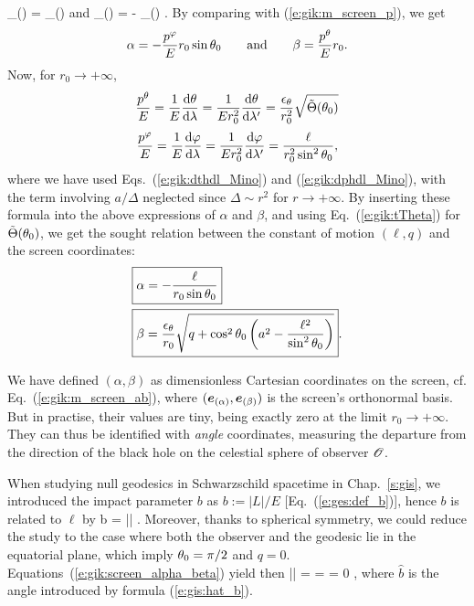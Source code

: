     _{(\alpha)} = _{(\ph)} \quad\mbox{and}\quad
    _{(\beta)} = - _{(\th)} .
\ee
By comparing with (\ref{e:gik:m_screen_p}), we get
\[
    \alpha = -  \frac{p^\varphi}{E} r_0 \sin\theta_0
    \qquad\mbox{and}\qquad
    \beta = \frac{p^\theta}{E} r_0 .
\]
Now, for $r_0\to +\infty$,
\[
   \frac{p^\theta}{E} = \frac{1}{E} \frac{\mathrm{d} \theta}{\mathrm{d} \lambda} = \frac{1}{E r_0^2}  \frac{\mathrm{d} \theta}{\mathrm{d} \lambda'} =
    \frac{\epsilon_\theta}{r_0^2} \sqrt{\tilde\Theta(\theta_0)}
\]
\[
 \frac{p^\varphi}{E} = \frac{1}{E} \frac{\mathrm{d} \varphi}{\mathrm{d} \lambda} = \frac{1}{E r_0^2}  \frac{\mathrm{d} \varphi}{\mathrm{d} \lambda'}
 = \frac{\ell}{r_0^2 \sin^2\theta_0} ,
\]
where we have used Eqs.~(\ref{e:gik:dthdl_Mino}) and (\ref{e:gik:dphdl_Mino}), with the
term involving $a/\Delta$ neglected since $\Delta \sim r^2$ for $r\to +\infty$.
By inserting these formula into the above expressions of $\alpha$ and $\beta$,
and using Eq.~(\ref{e:gik:tTheta}) for $\tilde\Theta(\theta_0)$,
we get the sought relation between the constant of motion $(\ell, q)$ and
the screen coordinates:
\begin{subequations}
\label{e:gik:screen_alpha_beta}
\begin{align}
& \fbox{$\displaystyle  \alpha = - \frac{\ell}{r_0\sin\theta_0} $} \\
& \fbox{$\displaystyle  \beta = \frac{\epsilon_\theta}{r_0} \sqrt{ q + \cos^2\theta_0 \left( a^2
    - \frac{\ell^2}{\sin^2\theta_0} \right) } $} .
\end{align}
\end{subequations}

\begin{remark}
We have defined $(\alpha,\beta)$ as dimensionless Cartesian coordinates on
the screen, cf. Eq.~(\ref{e:gik:m_screen_ab}), where $(\bm{e}_{(\alpha)}, \bm{e}_{(\beta)})$
is the screen's orthonormal basis. But in practise, their values are tiny,
being exactly zero at the limit $r_0\to +\infty$. They can thus be identified
with \emph{angle} coordinates, measuring the departure from the direction
of the black hole on the celestial sphere of observer $\mathscr{O}$.
\end{remark}

\begin{remark}
When studying null geodesics in Schwarzschild spacetime in Chap.~\ref{s:gis}, we
introduced the impact parameter $b$ as $b := |L|/E$ [Eq.~(\ref{e:ges:def_b})], hence
$b$ is related to $\ell$ by
\be
    b = |\ell| .
\ee
Moreover, thanks to spherical symmetry, we could reduce the study to the case
where both the observer
and the geodesic lie in the equatorial plane, which imply $\theta_0 = \pi/2$
and $q=0$. Equations~(\ref{e:gik:screen_alpha_beta}) yield then
\be
    |\alpha| =  =  \qand \beta = 0 ,
\ee
where $\hat{b}$ is the angle introduced by formula (\ref{e:gis:hat_b}).
\end{remark}

